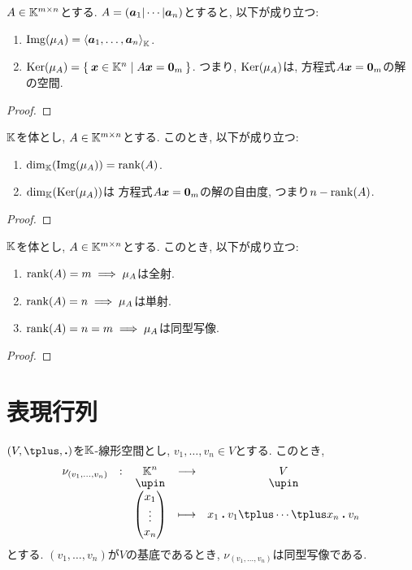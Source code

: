 \begin{prop}
  $A\in\mathbb{K}^{m\times n}$とする.
  $A=(\boldsymbol{a}_1|\cdots|\boldsymbol{a}_n)$とすると,
  以下が成り立つ:
  \begin{enumerate}
  \item $\operatorname{Img}(\mu_A)=\Braket{\boldsymbol{a}_1,\ldots,\boldsymbol{a}_n}_{\mathbb{K}}$.
  \item $\operatorname{Ker}(\mu_A)=\Set{\boldsymbol{x}\in\mathbb{K}^n|A\boldsymbol{x}=\boldsymbol{0}_m}$. つまり, $\operatorname{Ker}(\mu_A)$は,
    方程式$A\boldsymbol{x}=\boldsymbol{0}_m$の解の空間.
  \end{enumerate}
\end{prop}
\begin{proof}\end{proof}

\begin{cor}
  $\mathbb{K}$を体とし,
  $A\in\mathbb{K}^{m\times n}$とする.
  このとき,
  以下が成り立つ:
  \begin{enumerate}
  \item $\dim_{\mathbb{K}}(\operatorname{Img}(\mu_A))=\operatorname{rank}(A)$.
  \item $\dim_{\mathbb{K}}(\operatorname{Ker}(\mu_A))$は
    方程式$A\boldsymbol{x}=\boldsymbol{0}_m$の解の自由度, つまり$n-\operatorname{rank}(A)$.
  \end{enumerate}
\end{cor}
\begin{proof}\end{proof}

\begin{cor}
  $\mathbb{K}$を体とし,
  $A\in\mathbb{K}^{m\times n}$とする.
  このとき,
  以下が成り立つ:
  \begin{enumerate}
  \item $\operatorname{rank}(A)=m \implies \mu_A$は全射.
  \item $\operatorname{rank}(A)=n \implies \mu_A$は単射.
  \item $\operatorname{rank}(A)=n=m\implies \mu_A$は同型写像.
  \end{enumerate}
\end{cor}
\begin{proof}\end{proof}



\section{表現行列}
$(V,\plus,\act)$を$\mathbb{K}$-線形空間とし, $v_1,\ldots,v_n\in V$とする.
このとき,
\begin{align*}
    \shazo{\nu_{(v_1,\ldots,v_n)}}{\KK^n}{V}
          {\begin{pmatrix}x_1\\\vdots\\x_n\end{pmatrix}}
          {x_1\act v_1\plus \cdots\plus x_n\act v_n}
\end{align*}
とする.
$(v_1,\ldots,v_n)$が$V$の基底であるとき,
$\nu_{(v_1,\ldots,v_n)}$は同型写像である.

